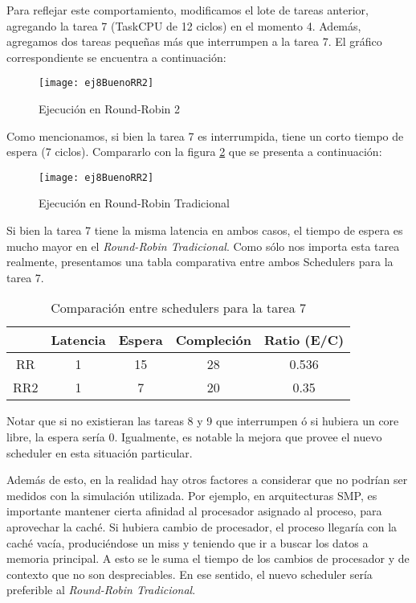 Para reflejar este comportamiento, modificamos el lote de tareas anterior, agregando la tarea 7 (TaskCPU de 12 ciclos) en el momento 4. Además, agregamos dos tareas pequeñas más que interrumpen a la tarea 7. El gráfico correspondiente se encuentra a continuación:

\begin{figure}[h]
    \texttt{[image: ej8BuenoRR2]}
    \caption{Ejecución en Round-Robin 2}
    \label{RR2Bueno}
\end{figure}

Como mencionamos, si bien la tarea 7 es interrumpida, tiene un corto tiempo de espera (7 ciclos). Compararlo con la figura \ref{RR2Malo} que se presenta a continuación:

\begin{figure}[h]
    \texttt{[image: ej8BuenoRR2]}
    \caption{Ejecución en Round-Robin Tradicional}
    \label{RR2Malo}
\end{figure}

Si bien la tarea 7 tiene la misma latencia en ambos casos, el tiempo de espera es mucho mayor en el \textit{Round-Robin Tradicional}. Como sólo nos importa esta tarea realmente, presentamos una tabla comparativa entre ambos Schedulers para la tarea 7.

\begin{table}[h]
  \caption{Comparación entre schedulers para la tarea 7}
  \centering
    \begin{tabular}{c c c c c}
    \hline
            & Latencia & Espera & Compleción & Ratio (E/C) \\
    \hline
        RR  &     1    &   15   &     28     &    0.536    \\
        RR2 &     1    &    7   &     20     &    0.35     \\
    \end{tabular}
\end{table}

Notar que si no existieran las tareas 8 y 9 que interrumpen ó si hubiera un core libre, la espera sería 0. Igualmente, es notable la mejora que provee el nuevo scheduler en esta situación particular.

Además de esto, en la realidad hay otros factores a considerar que no podrían ser medidos con la simulación utilizada. Por ejemplo, en arquitecturas SMP, es importante mantener cierta afinidad al procesador asignado al proceso, para aprovechar la caché. Si hubiera cambio de procesador, el proceso llegaría con la caché vacía, produciéndose un miss y teniendo que ir a buscar los datos a memoria principal. A esto se le suma el tiempo de los cambios de procesador y de contexto que no son despreciables. En ese sentido, el nuevo scheduler sería preferible al \textit{Round-Robin Tradicional}.
